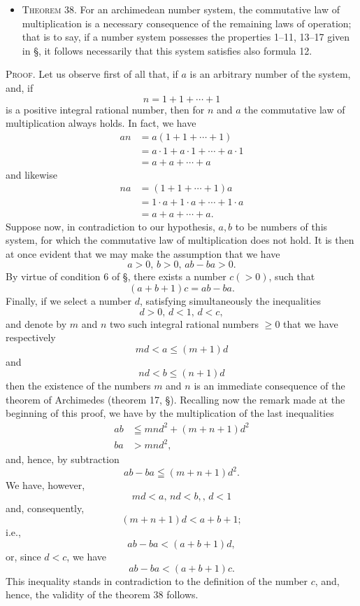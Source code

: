 \documentclass[11pt,oneside]{book}
\begin{document}
\begin{itemize}
\item[]{\scshape Theorem 38.} For an archimedean number system,
the commutative law of multiplication is a
necessary consequence of the remaining laws of
operation; that is to say, if a number system
possesses the properties 1--11, 13--17 given in
\S{}, it follows necessarily that this system satisfies
also formula 12.
\end{itemize}

{\scshape Proof}. Let us observe first of all that, if $a$ is an
arbitrary number of the system, and, if
\[
n = 1+1+\cdots+1
\]
is a positive integral rational number, then for $n$ and
$a$ the commutative law of multiplication always holds.
In fact, we have
\begin{align*}
 an &= a(1+ 1 + \cdots +1) \\
    &= a \cdot 1 + a\cdot 1 +\cdots +a\cdot 1\\
    &= a + a +\cdots +a
\end{align*}
and likewise
\begin{align*}
 na &= (1+ 1 + \cdots +1)a \\
    &= 1 \cdot a + 1\cdot a + \cdots + 1\cdot a\\
    &= a + a +\cdots +a.
\end{align*}
Suppose now, in contradiction to our hypothesis,
$a, b$ to be numbers of this system, for which the commutative
law of multiplication does not hold. It is
then at once evident that we may make the assumption
that we have
\[
 a> 0 \text{, }  b > 0 \text{, }  ab-ba > 0.
\]
By virtue of condition 6 of \S{}, there exists a number
$c(> 0)$, such that
\[
 (a+b+1) c = ab-ba.
\]
Finally, if we select a number $d$, satisfying simultaneously
the inequalities
\[
 d> 0 \text{, } d < 1 \text{, }  d<c,
\]
and denote by $m$ and $n$ two such integral rational
numbers $\ge 0$ that we have respectively
\[
 md < a \le (m+1) d
\]
and
\[
 nd < b \le (n+1) d
\]
then the existence of the numbers $m$ and $n$ is an immediate
consequence of the theorem of Archimedes
(theorem 17, \S{}). Recalling now the remark made
at the beginning of this proof, we have by the multiplication
of the last inequalities
\begin{align*}
 ab &\leqq mnd^2 + (m+n+1)d^2\\
 ba &> mnd^2,
\end{align*}
and, hence, by subtraction
\[
ab-ba \leqq (m+n+1)d^2.
\]
We have, however,
\[
md<a \text{, } nd<b, \text{, } d<1
\]
and, consequently,
\[
(m+n+1)d<a+b+1;
\]
i.e.,
\[
ab-ba<(a+b+1)d,
\]
or, since $d<c$, we have
\[
ab-ba<(a+b+1)c.
\]
This inequality stands in contradiction to the definition
of the number $c$, and, hence, the validity of the
theorem 38 follows.
\end{document}
